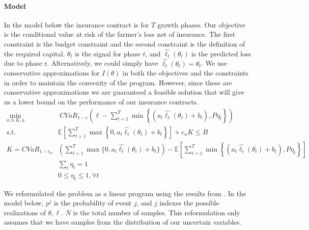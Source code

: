 \documentclass[11pt]{article}
\begin{document}
    \paragraph*{Model}
    In the model below the insurance contract is for $T$ growth phases. Our objective is the conditional value at risk of the farmer's loss net of insurance. The first constraint is the budget constraint and the second constraint is the definition of the required capital. $\theta_t$ is the signal for phase $t$, and $\hat{\ell_t}(\theta_t)$ is the predicted loss due to phase $t$. Alternatively, we could simply have $\hat{\ell_t}(\theta_t) = \theta_t$. We use conservative approximations for $I(\theta)$ in both the objectives and the constraints in order to maintain the convexity of the program. However, since these are conservative approximations we are guaranteed a feasible solution that will give us a lower bound on the performance of our insurance contracts. 
    \begin{align}
      \min_{a,b,K,\eta} &\ CVaR_{1-\epsilon}\left(\ell  - \sum_{t=1}^T \min \left \{(a_t \hat{\ell_t}(\theta_t) + b_t), P\eta_t \right \} \right)\\
      \text{s.t.   } & \mathbb{E}\left [\sum_{t=1}^T \max \left \{0,a_t \hat{\ell_t}(\theta_t) +b_t \right \} \right ] +c_{\kappa} K \leq B\\
       K = CVaR_{1-\epsilon_P} &\left( \sum_{t=1}^T \max \{0,a_t \hat{\ell_t}(\theta_t) +b_t \} \right) - \mathbb{E}\left [\sum_{t=1}^T \min \left \{(a_t \hat{\ell_t}(\theta_t) + b_t), P\eta_t \right \} \right ]\\
       & \sum_t \eta_t = 1\\
       & 0 \leq \eta_t \leq 1, \forall t
    \end{align}
    
    We reformulated the problem as a linear program  using the results from \cite{rockafellar2000optimization}. In the model below, $p^j$ is the probability of event $j$, and $j$ indexes the possible realizations of $\theta, \ell$. $N$ is the total number of samples. This reformulation only assumes that we have samples from the distribution of our uncertain variables.  
      
\end{document}
